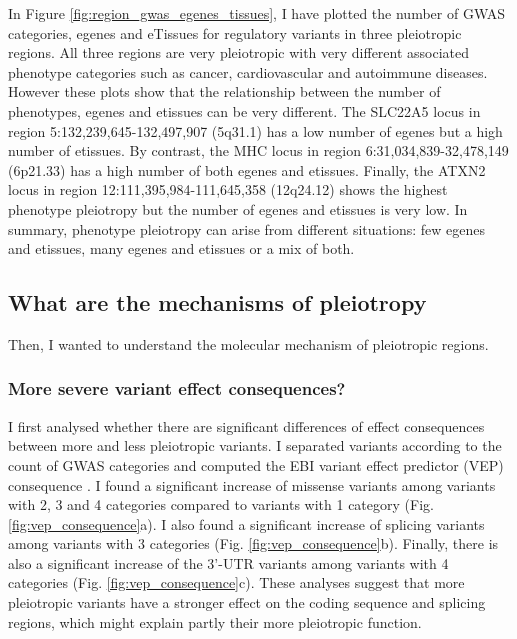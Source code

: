 In Figure \ref{fig:region_gwas_egenes_tissues}, I have plotted the number of GWAS categories, egenes and eTissues for regulatory variants in three pleiotropic regions.
%
All three regions are very pleiotropic with very different associated phenotype categories such as cancer, cardiovascular and autoimmune diseases.
%
However these plots show that the relationship between the number of phenotypes, egenes and etissues can be very different.
%
The SLC22A5 locus in region 5:132,239,645-132,497,907 (5q31.1) has a low number of egenes but a high number of etissues.
%
By contrast, the MHC locus in region 6:31,034,839-32,478,149 (6p21.33) has a high number of both egenes and etissues.
%
Finally, the ATXN2 locus in region 12:111,395,984-111,645,358 (12q24.12) shows the highest phenotype pleiotropy but the number of egenes and etissues is very low.
%
In summary, phenotype pleiotropy can arise from different situations: few egenes and etissues, many egenes and etissues or a mix of both.

\subsection*{What are the mechanisms of pleiotropy}

Then, I wanted to understand the molecular mechanism of pleiotropic regions.

\subsubsection*{More severe variant effect consequences?}

I first analysed whether there are significant differences of effect consequences between more and less pleiotropic variants.
%
I separated variants according to the count of GWAS categories and computed the EBI variant effect predictor (VEP) consequence \citep{2016.Cunningham.McLaren}.
%
I found a significant increase of missense variants among variants with 2, 3 and 4 categories compared to variants with 1 category (Fig. \ref{fig:vep_consequence}a).
%
I also found a significant increase of splicing variants among variants with 3 categories (Fig. \ref{fig:vep_consequence}b).
%
Finally, there is also a significant increase of the 3'-UTR variants among variants with 4 categories (Fig. \ref{fig:vep_consequence}c).
%
These analyses suggest that more pleiotropic variants have a stronger effect on the coding sequence and splicing regions, which might explain partly their more pleiotropic function.

